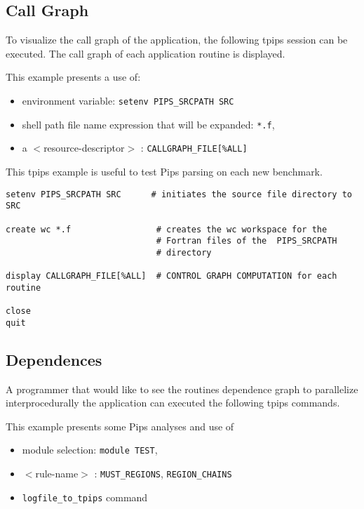 \documentclass[a4paper,12pt]{article}
\begin{document}
\subsection{Call Graph}
\label{exm1}

To visualize the  call graph of the application, the following tpips
session can be executed. The call graph of each application routine is
displayed. 

This example presents a use of:

\begin{itemize}
\item environment variable: \verb+setenv PIPS_SRCPATH SRC+
\item shell path file name expression that will be expanded: \verb+*.f+,
\item a $<$resource-descriptor$>$ : \verb+CALLGRAPH_FILE[%ALL]+
\end{itemize}
This tpips example is useful to test Pips parsing   on each  new
benchmark. 

\begin{verbatim}
setenv PIPS_SRCPATH SRC      # initiates the source file directory to SRC

create wc *.f                 # creates the wc workspace for the
                              # Fortran files of the  PIPS_SRCPATH 
                              # directory

display CALLGRAPH_FILE[%ALL]  # CONTROL GRAPH COMPUTATION for each routine

close 
quit

\end{verbatim}


\subsection{Dependences}
\label{exm2}
A programmer that would like to see the routines dependence graph to parallelize
interprocedurally the application can executed the following tpips
commands. 

This example presents some Pips analyses and  use of 
\begin{itemize}
\item module selection: \verb+module TEST+,
\item $<$rule-name$>$ : \verb+MUST_REGIONS+, \verb+REGION_CHAINS+ 
\item \verb+logfile_to_tpips+ command
\end{itemize}
\end{document}
